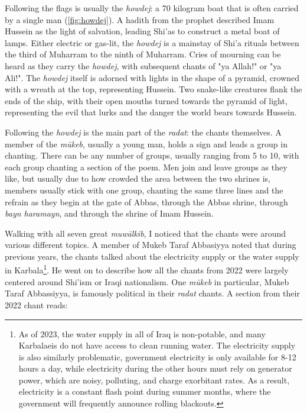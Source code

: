 Following the flags is usually the \emph{howdej}: a 70 kilogram boat that is often carried by a single man (\ref{fig:howdej}). A hadith from the prophet described Imam Hussein as the light of salvation, leading Shi'as to construct a metal boat of lamps. Either electric or gas-lit, the \emph{howdej} is a mainstay of Shi'a rituals between the third of Muharram to the ninth of Muharram. Cries of mourning can be heard as they carry the \emph{howdej}, with subsequent chants of "ya Allah!" or "ya Ali!". The \emph{howdej} itself is adorned with lights in the shape of a pyramid, crowned with a wreath at the top, representing Hussein. Two snake-like creatures flank the ends of the ship, with their open mouths turned towards the pyramid of light, representing the evil that lurks and the danger the world bears towards Hussein. 




Following the \emph{howdej} is the main part of the \emph{radat}: the chants themselves. A member of the \emph{mūkeb}, usually a young man, holds a sign and leads a group in chanting. There can be any number of groups, usually ranging from 5 to 10, with each group chanting a section of the poem. Men join and leave groups as they like, but usually due to how crowded the area between the two shrines is, members usually stick with one group, chanting the same three lines and the refrain as they begin at the gate of Abbas, through the Abbas shrine, through \emph{bayn haramayn}, and through the shrine of Imam Hussein. 

Walking with all seven great \emph{muwālkib}, I noticed that the chants were around various different topics. A member of Mukeb Taraf Abbasiyya noted that during previous years, the chants talked about the electricity supply or the water supply in Karbala\footnote{As of 2023, the water supply in all of Iraq is non-potable, and many Karbalaeis do not have access to clean running water. The electricity supply is also similarly problematic, government electricity is only available for 8-12 hours a day, while electricity during the other hours must rely on generator power, which are noisy, polluting, and charge exorbitant rates. As a result, electricity is a constant flash point during summer months, where the government will frequently announce rolling blackouts.}. He went on to describe how all the chants from 2022 were largely centered around Shi'ism or Iraqi nationalism. One \emph{mūkeb} in particular, Mukeb Taraf Abbassiyya, is famously political in their \emph{radat} chants. A section from their 2022 chant reads: 


